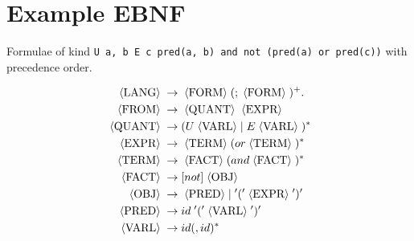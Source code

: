 \section{Example EBNF}
Formulae of kind \texttt{U a, b E c pred(a, b) and not (pred(a) or pred(c))} with precedence order.

\newcommand{\nont}[1]{\;\langle \text{#1} \rangle\;}
\begin{align*}
    \nont{LANG} &\rarr \nont{FORM} (; \nont{FORM})^+ . \\
    \nont{FROM} &\rarr \nont{QUANT} \nont{EXPR} \\
    \nont{QUANT} &\rarr (U \nont{VARL} |\; E \nont{VARL})^* \\
    \nont{EXPR} &\rarr \nont{TERM} (or \nont{TERM})^* \\
    \nont{TERM} &\rarr \nont{FACT} (and \nont{FACT})^* \\
    \nont{FACT} &\rarr [not] \nont{OBJ} \\
    \nont{OBJ} &\rarr \nont{PRED} |\; '(' \nont{EXPR} ')' \\
    \nont{PRED} &\rarr id\; '(' \nont{VARL} ')' \\
    \nont{VARL} &\rarr id (, id)^*
\end{align*}
